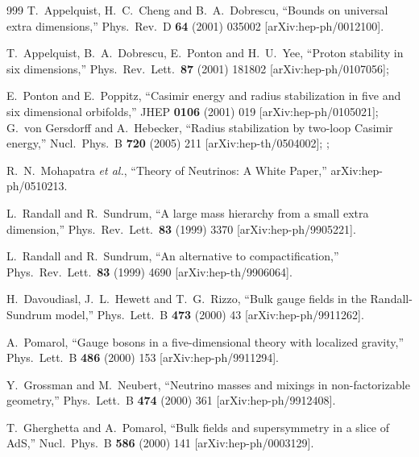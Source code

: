 \begin{thebibliography}{999}
  T.~Appelquist, H.~C.~Cheng and B.~A.~Dobrescu,
  ``Bounds on universal extra dimensions,''
  Phys.\ Rev.\ D {\bf 64} (2001) 035002
  [arXiv:hep-ph/0012100].

  T.~Appelquist, B.~A.~Dobrescu, E.~Ponton and H.~U.~Yee,
  ``Proton stability in six dimensions,''
  Phys.\ Rev.\ Lett.\  {\bf 87} (2001) 181802
  [arXiv:hep-ph/0107056];

  E.~Ponton and E.~Poppitz,
  ``Casimir energy and radius stabilization in five and six dimensional
  orbifolds,''
  JHEP {\bf 0106} (2001) 019
  [arXiv:hep-ph/0105021];
  G.~von Gersdorff and A.~Hebecker,
  ``Radius stabilization by two-loop Casimir energy,''
  Nucl.\ Phys.\ B {\bf 720} (2005) 211
  [arXiv:hep-th/0504002];
;

  R.~N.~Mohapatra {\it et al.},
  ``Theory of Neutrinos: A White Paper,''
  arXiv:hep-ph/0510213.

  L.~Randall and R.~Sundrum,
  ``A large mass hierarchy from a small extra dimension,''
  Phys.\ Rev.\ Lett.\  {\bf 83} (1999) 3370
  [arXiv:hep-ph/9905221].

  L.~Randall and R.~Sundrum,
  ``An alternative to compactification,''
  Phys.\ Rev.\ Lett.\  {\bf 83} (1999) 4690
  [arXiv:hep-th/9906064].

  H.~Davoudiasl, J.~L.~Hewett and T.~G.~Rizzo,
  ``Bulk gauge fields in the Randall-Sundrum model,''
  Phys.\ Lett.\ B {\bf 473} (2000) 43
  [arXiv:hep-ph/9911262].

  A.~Pomarol,
  ``Gauge bosons in a five-dimensional theory with localized gravity,''
  Phys.\ Lett.\ B {\bf 486} (2000) 153
  [arXiv:hep-ph/9911294].

  Y.~Grossman and M.~Neubert,
  ``Neutrino masses and mixings in non-factorizable geometry,''
  Phys.\ Lett.\ B {\bf 474} (2000) 361
  [arXiv:hep-ph/9912408].

  T.~Gherghetta and A.~Pomarol,
  ``Bulk fields and supersymmetry in a slice of AdS,''
  Nucl.\ Phys.\ B {\bf 586} (2000) 141
  [arXiv:hep-ph/0003129].


\end{thebibliography}
